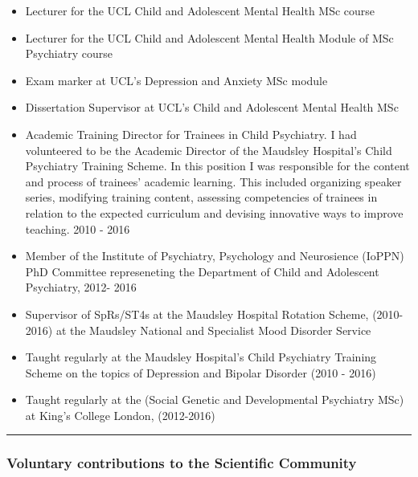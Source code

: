 \documentclass[
]{article}
\begin{document}
\begin{itemize}
\item
  Lecturer for the UCL Child and Adolescent Mental Health MSc course
\item
  Lecturer for the UCL Child and Adolescent Mental Health Module of MSc
  Psychiatry course
\item
  Exam marker at UCL's Depression and Anxiety MSc module
\item
  Dissertation Supervisor at UCL's Child and Adolescent Mental Health
  MSc
\item
  Academic Training Director for Trainees in Child Psychiatry. I had
  volunteered to be the Academic Director of the Maudsley Hospital's
  Child Psychiatry Training Scheme. In this position I was responsible
  for the content and process of trainees' academic learning. This
  included organizing speaker series, modifying training content,
  assessing competencies of trainees in relation to the expected
  curriculum and devising innovative ways to improve teaching. 2010 -
  2016
\item
  Member of the Institute of Psychiatry, Psychology and Neurosience
  (IoPPN) PhD Committee represeneting the Department of Child and
  Adolescent Psychiatry, 2012- 2016
\item
  Supervisor of SpRs/ST4s at the Maudsley Hospital Rotation Scheme,
  (2010-2016) at the Maudsley National and Specialist Mood Disorder
  Service
\item
  Taught regularly at the Maudsley Hospital's Child Psychiatry Training
  Scheme on the topics of Depression and Bipolar Disorder (2010 - 2016)
\item
  Taught regularly at the (Social Genetic and Developmental Psychiatry
  MSc) at King's College London, (2012-2016)
\end{itemize}

\begin{center}\rule{0.5\linewidth}{0.5pt}\end{center}

\hypertarget{voluntary-contributions-to-the-scientific-community}{%
\subsubsection{Voluntary contributions to the Scientific
Community}\label{voluntary-contributions-to-the-scientific-community}}
\end{document}
